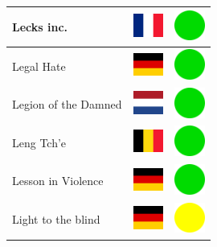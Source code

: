 \documentclass[12pt, a4paper, twoside]{report}
\begin{document}
\begin{center}
\begin{longtable}{|p{5cm}|p{2cm}|p{2cm}|}
Lecks inc. & \includegraphics[width=1cm]{4x3/fr} & \includegraphics[width=1cm]{likes/y} \\ \hline
Legal Hate & \includegraphics[width=1cm]{4x3/de} & \includegraphics[width=1cm]{likes/y} \\ \hline
Legion of the Damned & \includegraphics[width=1cm]{4x3/nl} & \includegraphics[width=1cm]{likes/y} \\ \hline
Leng Tch'e & \includegraphics[width=1cm]{4x3/be} & \includegraphics[width=1cm]{likes/y} \\ \hline
Lesson in Violence & \includegraphics[width=1cm]{4x3/de} & \includegraphics[width=1cm]{likes/y} \\ \hline
Light to the blind & \includegraphics[width=1cm]{4x3/de} & \includegraphics[width=1cm]{likes/m} \\ \hline

\end{longtable}
\end{center}
\end{document}
